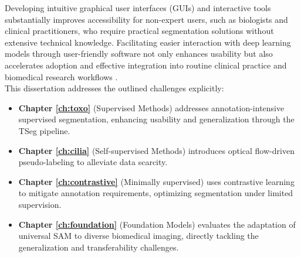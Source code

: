 \documentclass[./dissertation.tex]{subfiles}
\begin{document}
Developing intuitive graphical user interfaces (GUIs) and interactive tools substantially improves accessibility for non-expert users, such as biologists and clinical practitioners, who require practical segmentation solutions without extensive technical knowledge. Facilitating easier interaction with deep learning models through user-friendly software not only enhances usability but also accelerates adoption and effective integration into routine clinical practice and biomedical research workflows \cite{sofroniew2022napari}. \\



This dissertation addresses the outlined challenges explicitly:
\begin{itemize}
    \item \textbf{Chapter \ref{ch:toxo}} (Supervised Methods) addresses annotation-intensive supervised segmentation, enhancing usability and generalization through the TSeg pipeline.

    \item \textbf{Chapter \ref{ch:cilia}} (Self-supervised Methods) introduces optical flow-driven pseudo-labeling to alleviate data scarcity.

    \item \textbf{Chapter \ref{ch:contrastive}} (Minimally supervised) uses contrastive learning to mitigate annotation requirements, optimizing segmentation under limited supervision.

    \item \textbf{Chapter \ref{ch:foundation}} (Foundation Models) evaluates the adaptation of universal SAM to diverse biomedical imaging, directly tackling the generalization and transferability challenges.
\end{itemize}

\end{document}
